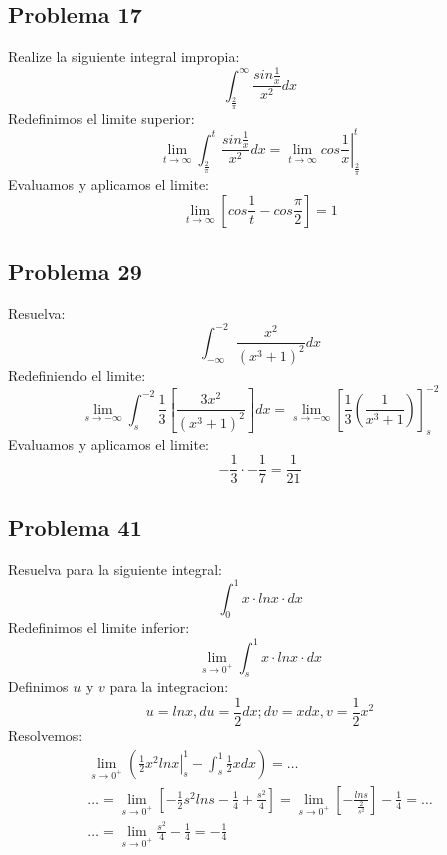 \documentclass{article}
\begin{document}
\subsection{Problema 17}
Realize la siguiente integral impropia:
\setcounter{equation}{0}
\begin{equation}
    \int_{\frac{2}{\pi}}^{\infty}\frac{sin\frac{1}{x}}{x^2}dx
\end{equation}
Redefinimos el limite superior:
\begin{equation}
    \lim_{t\to \infty}\int_{\frac{2}{\pi}}^{t}\frac{sin\frac{1}{x}}{x^2}dx = \lim_{t\to \infty} \left.cos\frac{1}{x}\right|_{\frac{2}{\pi}}^{t}
\end{equation}
Evaluamos y aplicamos el limite:
\begin{equation}
    \lim_{t\to \infty}\left[cos\frac{1}{t}-cos\frac{\pi}{2}\right] = 1
\end{equation}

\subsection{Problema 29}
Resuelva:
\setcounter{equation}{0}
\begin{equation}
    \int_{-\infty}^{-2}\frac{x^2}{(x^3+1)^2}dx
\end{equation}
Redefiniendo el limite:
\begin{equation}
    \lim_{s \to -\infty}\int_{s}^{-2}\frac{1}{3}\left[\frac{3x^2}{(x^3+1)^2}\right]dx = \lim_{s \to -\infty}\left[\frac{1}{3}\left(\frac{1}{x^3+1}\right)\right]_{s}^{-2}
\end{equation}
Evaluamos y aplicamos el limite:
\begin{equation}
    -\frac{1}{3}\cdot-\frac{1}{7} = \frac{1}{21}
\end{equation}

\subsection{Problema 41}
Resuelva para la siguiente integral:
\setcounter{equation}{0}
\begin{equation}
    \int_{0}^{1}x\cdot lnx\cdot dx
\end{equation}
Redefinimos el limite inferior:
\begin{equation}
    \lim_{s\to 0^+}\int_{s}^{1}x\cdot lnx\cdot dx
\end{equation}
Definimos $u$ y $v$ para la integracion:
\begin{equation}
    u=lnx,du=\frac{1}{2}dx; dv=xdx, v=\frac{1}{2}x^2
\end{equation}
Resolvemos:
\begin{align}
    \lim_{s\to 0^+}\left(\left.\frac{1}{2}x^2 lnx\right|_{s}^{1}-\int_{s}^{1}\frac{1}{2}xdx\right) = \dots \\ \dots = \lim_{s\to 0^+} \left[-\frac{1}{2}s^2 lns-\frac{1}{4}+\frac{s^2}{4}\right] = \lim_{s\to 0^+} \left[-\frac{lns}{\frac{2}{s^2}}\right] - \frac{1}{4} = \dots \\ \dots = \lim_{s\to 0^+} \frac{s^2}{4}-\frac{1}{4} = -\frac{1}{4}
\end{align}
\end{document}
